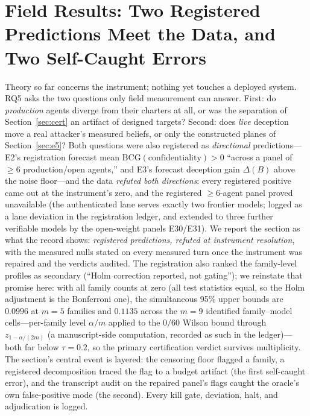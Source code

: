 \section{Field Results: Two Registered Predictions Meet the Data, and
Two Self-Caught Errors}\label{sec:field}

Theory so far concerns the instrument; nothing yet touches a deployed
system. RQ5 asks the two questions only field measurement can answer.
First: do \emph{production} agents diverge from their charters at all, or
was the separation of Section~\ref{sec:cert} an artifact of designed
targets? Second: does \emph{live} deception move a real attacker's measured
beliefs, or only the constructed planes of Section~\ref{sec:e5}? Both
questions were also registered as \emph{directional} predictions---E2's
registration forecast mean $\mathrm{BCG}(\text{confidentiality})>0$
``across a panel of $\ge6$ production/open agents,'' and E3's forecast
deception gain $\Delta(B)$ above the noise floor---and the data
\emph{refuted both directions}: every registered positive came out at
the instrument's zero, and the registered $\ge6$-agent panel proved
unavailable (the authenticated lane serves exactly two frontier models;
logged as a lane deviation in the registration ledger, and extended to
three further verifiable models by the open-weight panels E30/E31). We
report the section as what the record shows: \emph{registered
predictions, refuted at instrument resolution}, with the measured nulls
stated on every measured turn once the instrument was repaired and the
verdicts audited. The registration also ranked the family-level profiles
as secondary (``Holm correction reported, not gating''); we reinstate that
promise here: with all family counts at zero (all test statistics equal,
so the Holm adjustment is the Bonferroni one), the simultaneous 95\%
upper bounds are $0.0996$ at $m{=}5$ families and $0.1135$ across the
$m{=}9$ identified family--model cells---per-family level $\alpha/m$
applied to the $0/60$ Wilson bound through
$z_{1-\alpha/(2m)}$ (a manuscript-side computation, recorded as such in
the ledger)---both far below $\tau=0.2$, so
the primary certification verdict survives multiplicity. The section's
central event is layered: the censoring floor flagged a
family, a registered decomposition traced the flag to a budget artifact
(the first self-caught error), and the transcript audit on the repaired
panel's flags caught the oracle's own false-positive mode (the second).
Every kill gate, deviation, halt, and adjudication is logged.

